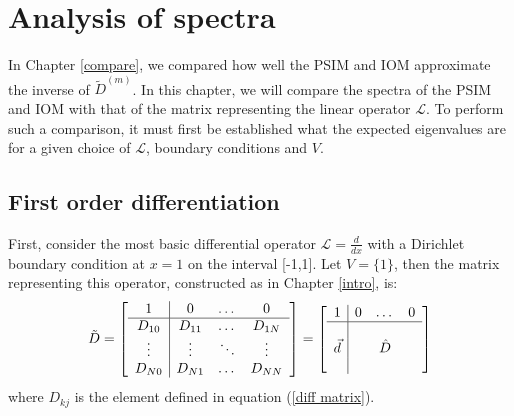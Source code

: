 \documentclass{sfuthesis}
\begin{document}


\chapter{Analysis of spectra}
\label{ch:spectra}

In Chapter \ref{compare}, we compared how well the PSIM and IOM approximate the inverse of $\tilde{D}^{(m)}$.
In this chapter, we will compare the spectra of the PSIM and IOM with that of the matrix representing the linear operator $\mathcal{L}$.
To perform such a comparison, it must first be established what the expected eigenvalues are for a given choice of $\mathcal{L}$, boundary conditions and $V$.

\section{First order differentiation}

First, consider the most basic differential operator $\mathcal{L} = \frac{d}{dx}$ with a Dirichlet boundary condition at $x=1$ on the interval [-1,1].
Let $V = \{1\}$, then the matrix representing this operator, constructed as in Chapter \ref{intro}, is:
\begin{equation}
\tilde{D} = 
\left [ \begin{array}{c | c c c} 1 & 0 & \dots & 0 \\ \hline
D_{10} & D_{11} & \dots & D_{1N} \\
\vdots & \vdots & \ddots & \vdots \\
D_{N0} & D_{N1} & \dots & D_{NN} \end{array} \right ] =
\left [ \begin{array}{c | c c c} 1 & 0 & \dots & 0 \\ \hline
 &  &  &  \\
\vec{d} &  & \hat{D} &  \\
 &  &  &  \end{array} \right ] 
\end{equation}
where $D_{kj}$ is the element defined in equation (\ref{diff matrix}).
\end{document}
